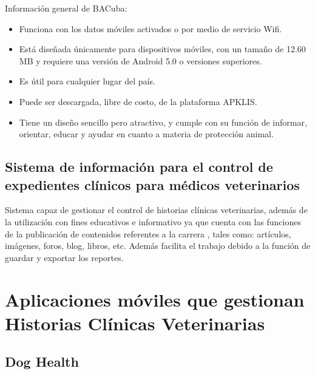 Información general de BACuba:


\begin{itemize}
	\item Funciona con los datos móviles activados o por medio de servicio Wifi.
	\item Está diseñada únicamente para dispositivos móviles, con un tamaño de 12.60 MB y requiere una versión de Android 5.0 o versiones superiores.
	\item Es útil para cualquier lugar del país.
	\item Puede ser descargada, libre de costo, de la plataforma APKLIS.
	\item Tiene un diseño sencillo pero atractivo, y cumple con su función de informar, orientar, educar y ayudar en cuanto a materia de protección animal.
\end{itemize}


\subsection{Sistema de información para el control de expedientes clínicos para médicos veterinarios}

Sistema capaz de gestionar el control de historias 
clínicas veterinarias, además de la utilización con fines educativos e informativo ya que 
cuenta con las funciones de la publicación de contenidos referentes a la carrera , tales 
como: artículos, imágenes, foros, blog, libros, etc. Además facilita el trabajo debido a la 
función de guardar y exportar los reportes. 
\newline

\section{Aplicaciones móviles que gestionan Historias Clínicas Veterinarias}\label{chapter:introduction}

\subsection{Dog Health}\label{chapter:introduction}

